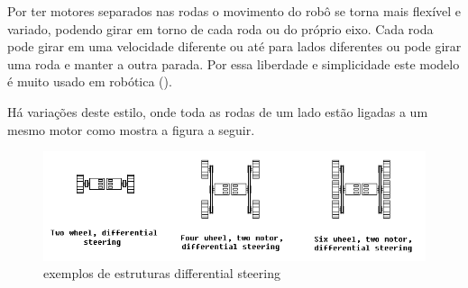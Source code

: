 Por ter motores separados nas rodas o movimento do robô se torna mais flexível e variado, podendo girar em torno de cada roda ou do próprio eixo. Cada roda pode girar em uma velocidade diferente ou até para lados diferentes ou pode girar uma roda e manter a outra parada. Por essa liberdade e simplicidade este modelo é muito usado em robótica (\cite{Mataric2007}).

Há variações deste estilo, onde toda as rodas de um lado estão ligadas a um mesmo motor como mostra a figura a seguir.

\begin{figure}[h]
	\centering
	\label{fig18}
		\includegraphics[keepaspectratio=true,scale=0.7]{figuras/3differentialSteering.png}
	\caption{exemplos de estruturas differential steering \cite{IMG_DIFFERENTIAL_STEERING_SITE}}
\end{figure}
